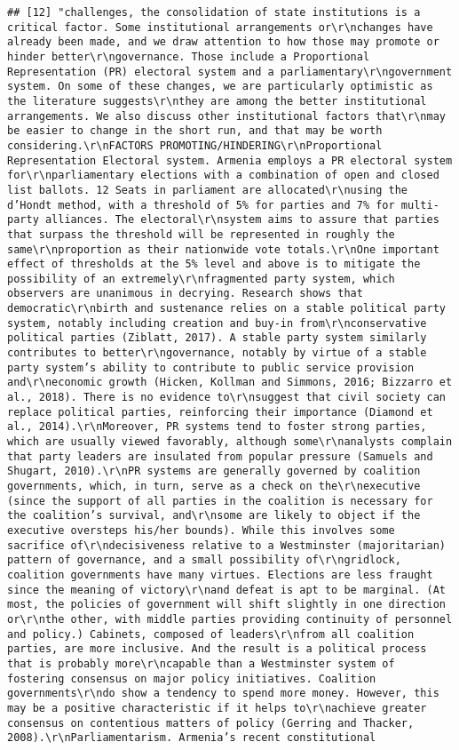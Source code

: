 \documentclass[
]{article}
\begin{document}
\begin{verbatim}
## [12] "challenges, the consolidation of state institutions is a critical factor. Some institutional arrangements or\r\nchanges have already been made, and we draw attention to how those may promote or hinder better\r\ngovernance. Those include a Proportional Representation (PR) electoral system and a parliamentary\r\ngovernment system. On some of these changes, we are particularly optimistic as the literature suggests\r\nthey are among the better institutional arrangements. We also discuss other institutional factors that\r\nmay be easier to change in the short run, and that may be worth considering.\r\nFACTORS PROMOTING/HINDERING\r\nProportional Representation Electoral system. Armenia employs a PR electoral system for\r\nparliamentary elections with a combination of open and closed list ballots. 12 Seats in parliament are allocated\r\nusing the d’Hondt method, with a threshold of 5% for parties and 7% for multi-party alliances. The electoral\r\nsystem aims to assure that parties that surpass the threshold will be represented in roughly the same\r\nproportion as their nationwide vote totals.\r\nOne important effect of thresholds at the 5% level and above is to mitigate the possibility of an extremely\r\nfragmented party system, which observers are unanimous in decrying. Research shows that democratic\r\nbirth and sustenance relies on a stable political party system, notably including creation and buy-in from\r\nconservative political parties (Ziblatt, 2017). A stable party system similarly contributes to better\r\ngovernance, notably by virtue of a stable party system’s ability to contribute to public service provision and\r\neconomic growth (Hicken, Kollman and Simmons, 2016; Bizzarro et al., 2018). There is no evidence to\r\nsuggest that civil society can replace political parties, reinforcing their importance (Diamond et al., 2014).\r\nMoreover, PR systems tend to foster strong parties, which are usually viewed favorably, although some\r\nanalysts complain that party leaders are insulated from popular pressure (Samuels and Shugart, 2010).\r\nPR systems are generally governed by coalition governments, which, in turn, serve as a check on the\r\nexecutive (since the support of all parties in the coalition is necessary for the coalition’s survival, and\r\nsome are likely to object if the executive oversteps his/her bounds). While this involves some sacrifice of\r\ndecisiveness relative to a Westminster (majoritarian) pattern of governance, and a small possibility of\r\ngridlock, coalition governments have many virtues. Elections are less fraught since the meaning of victory\r\nand defeat is apt to be marginal. (At most, the policies of government will shift slightly in one direction or\r\nthe other, with middle parties providing continuity of personnel and policy.) Cabinets, composed of leaders\r\nfrom all coalition parties, are more inclusive. And the result is a political process that is probably more\r\ncapable than a Westminster system of fostering consensus on major policy initiatives. Coalition governments\r\ndo show a tendency to spend more money. However, this may be a positive characteristic if it helps to\r\nachieve greater consensus on contentious matters of policy (Gerring and Thacker, 2008).\r\nParliamentarism. Armenia’s recent constitutional 
\end{verbatim}
\end{document}
